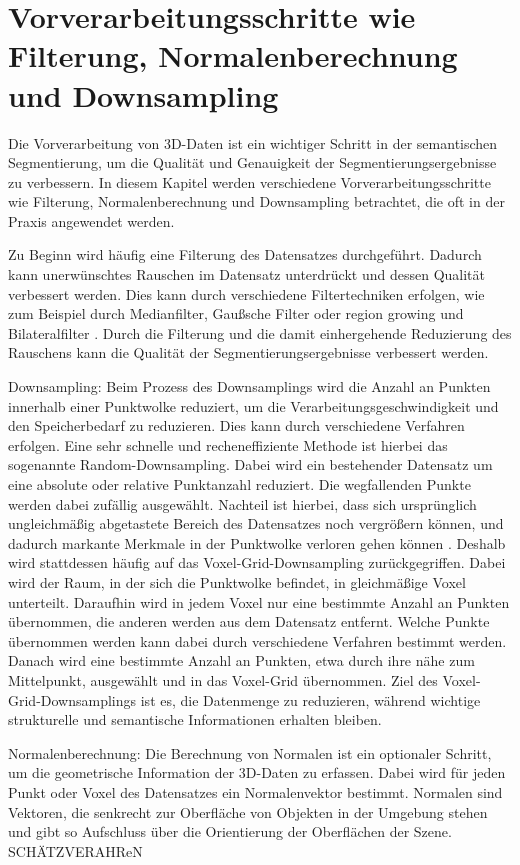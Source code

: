 \section{Vorverarbeitungsschritte wie Filterung, Normalenberechnung und Downsampling}

Die Vorverarbeitung von 3D-Daten ist ein wichtiger Schritt in der semantischen
Segmentierung, um die Qualität und Genauigkeit der Segmentierungsergebnisse zu
verbessern. In diesem Kapitel werden verschiedene Vorverarbeitungsschritte wie
Filterung, Normalenberechnung und Downsampling betrachtet, die oft in der
Praxis angewendet werden.

Zu Beginn wird häufig eine Filterung des Datensatzes durchgeführt. Dadurch kann
unerwünschtes Rauschen im Datensatz unterdrückt und dessen Qualität verbessert
werden. Dies kann durch verschiedene Filtertechniken erfolgen, wie zum Beispiel
durch Medianfilter, Gaußsche Filter \cite{9191237} oder region growing und
Bilateralfilter \cite{6460813}. Durch die Filterung und die damit einhergehende
Reduzierung des Rauschens kann die Qualität der Segmentierungsergebnisse
verbessert werden.

Downsampling: Beim Prozess des Downsamplings wird die Anzahl an Punkten
innerhalb einer Punktwolke reduziert, um die Verarbeitungsgeschwindigkeit und
den Speicherbedarf zu reduzieren. Dies kann durch verschiedene Verfahren
erfolgen. Eine sehr schnelle und recheneffiziente Methode ist hierbei das
sogenannte Random-Downsampling. Dabei wird ein bestehender Datensatz um eine
absolute oder relative Punktanzahl reduziert. Die wegfallenden Punkte werden
dabei zufällig ausgewählt. Nachteil ist hierbei, dass sich ursprünglich
ungleichmäßig abgetastete Bereich des Datensatzes noch vergrößern können, und
dadurch markante Merkmale in der Punktwolke verloren gehen können
\cite{987567547}. Deshalb wird stattdessen häufig auf das Voxel-Grid-Downsampling
zurückgegriffen. Dabei wird der Raum, in der sich die Punktwolke befindet, in
gleichmäßige Voxel unterteilt. Daraufhin wird in jedem Voxel nur eine bestimmte
Anzahl an Punkten übernommen, die anderen werden aus dem Datensatz entfernt.
Welche Punkte übernommen werden kann dabei durch verschiedene Verfahren
bestimmt werden. Danach wird eine bestimmte Anzahl an Punkten, etwa durch ihre
nähe zum Mittelpunkt, ausgewählt und in das Voxel-Grid übernommen. Ziel des
Voxel-Grid-Downsamplings ist es, die Datenmenge zu reduzieren, während wichtige
strukturelle und semantische Informationen erhalten bleiben.

Normalenberechnung: Die Berechnung von Normalen ist ein optionaler Schritt, um
die geometrische Information der 3D-Daten zu erfassen. Dabei wird für jeden
Punkt oder Voxel des Datensatzes ein Normalenvektor bestimmt. Normalen sind
Vektoren, die senkrecht zur Oberfläche von Objekten in der Umgebung stehen und
gibt so Aufschluss über die Orientierung der Oberflächen der Szene.
SCHÄTZVERAHReN

